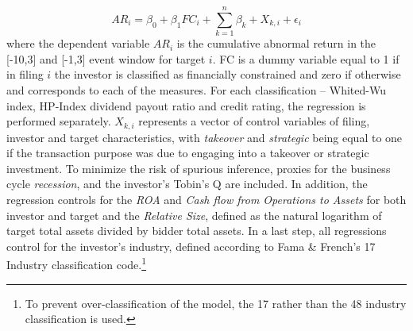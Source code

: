 \documentclass[12pt]{article}
\begin{document}
\begin{equation}
	AR_{i}=\beta_{0}+\beta_{1}FC_{i}+\sum_{k=1}^{n}\beta_{k}+X_{k,i}+\epsilon_{i}
\end{equation}
where the dependent variable $AR_{i}$ is the cumulative abnormal return in the [-10,3] and [-1,3] event window for target $i$. FC is a dummy variable equal to 1 if in filing $i$ the investor is classified as financially constrained and zero if otherwise and corresponds to each of the measures. For each classification -- Whited-Wu index, HP-Index dividend payout ratio and credit rating, the regression is performed separately. $X_{k,i}$ represents a vector of control variables of filing, investor and target characteristics, with \emph{takeover} and \emph{strategic} being equal to one if the transaction purpose was due to engaging into a takeover or strategic investment.  To minimize the risk of spurious inference, proxies for the business cycle \emph{recession}, and the investor's Tobin's Q are included. In addition, the regression controls for the \emph{ROA} and \emph{Cash flow from Operations to Assets} for both investor and target and the \emph{Relative Size}, defined as the natural logarithm of target total assets divided by bidder total assets. In a last step, all regressions control for the investor's industry, defined according to Fama \& French's 17 Industry classification code.\footnote{To prevent over-classification of the model, the 17 rather than the 48 industry classification is used.} 
\end{document}
